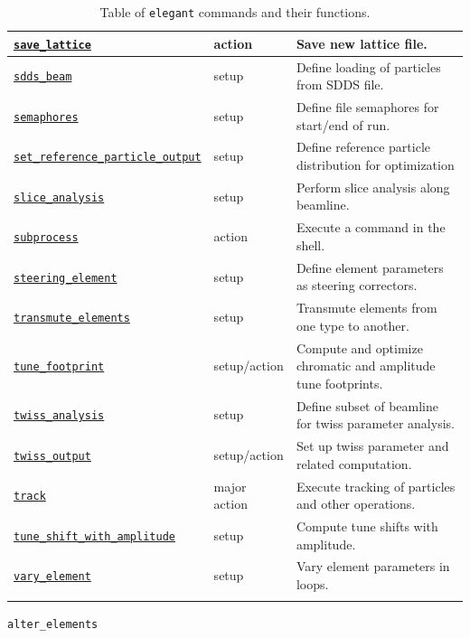 \documentclass[11pt]{article}
\begin{document}
\begin{longtable}{|p{2.75in}|p{0.75in}|p{2.75in}|}
\hyperref[subsec:savelattice]{\tt save\_lattice} & action & Save new lattice file. \\ \hline
\hyperref[subsec:sddsbeam]{\tt sdds\_beam} & setup & Define loading of particles from SDDS file. \\ \hline
\hyperref[subsec:semaphores]{\tt semaphores} & setup & Define file semaphores for start/end of run. \\ \hline
\hyperref[subsec:setreferenceparticleoutput]{\tt set\_reference\_particle\_output} & setup  & Define reference particle distribution for optimization \\ \hline
\hyperref[subsec:sliceanalysis]{\tt slice\_analysis} & setup & Perform slice analysis along beamline. \\ \hline
\hyperref[subsec:subprocess]{\tt subprocess} & action & Execute a command in the shell. \\ \hline
\hyperref[subsec:steeringelement]{\tt steering\_element} & setup & Define element parameters as steering correctors. \\ \hline
\hyperref[subsec:transmuteelements]{\tt transmute\_elements} & setup & Transmute elements from one type to another. \\ \hline
\hyperref[subsec:tunefootprint]{\tt tune\_footprint} & setup/action & Compute and optimize chromatic and amplitude tune footprints. \\ \hline
\hyperref[subsec:twissanalysis]{\tt twiss\_analysis} & setup & Define subset of beamline for twiss parameter analysis. \\ \hline
\hyperref[subsec:twissoutput]{\tt twiss\_output} & setup/action & Set up twiss parameter and related computation. \\ \hline
\hyperref[subsec:track]{\tt track} & major action & Execute tracking of particles and other operations. \\ \hline
\hyperref[subsec:tuneshiftwithamplitude]{\tt tune\_shift\_with\_amplitude} & setup & Compute tune shifts with amplitude. \\ \hline
\hyperref[subsec:varyelement]{\tt vary\_element} & setup & Vary element parameters in loops. \\ \hline
\caption{Table of {\tt elegant} commands and their functions.}
\end{longtable}

\clearpage

\newpage
\begin{center}{\Large\verb|alter_elements|}\end{center}
\end{document}
